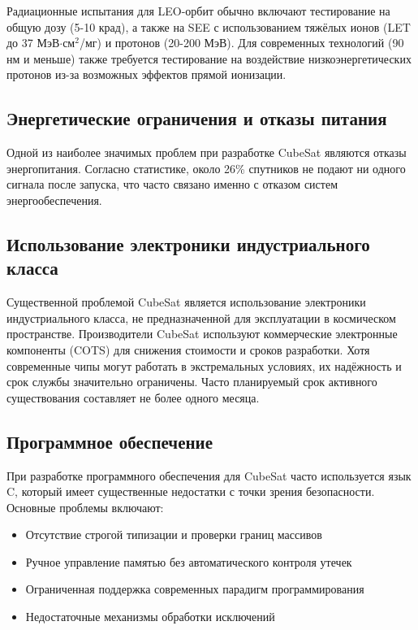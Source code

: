 Радиационные испытания для LEO-орбит обычно включают тестирование на общую дозу (5-10 крад), а также на SEE с использованием тяжёлых ионов (LET до 37 МэВ$\cdot$см$^2$/мг) и протонов (20-200 МэВ)\cite{proton_guide}. Для современных технологий (90 нм и меньше) также требуется тестирование на воздействие низкоэнергетических протонов из-за возможных эффектов прямой ионизации\cite{escc_see_test}.



\subsection{Энергетические ограничения и отказы питания}
Одной из наиболее значимых проблем при разработке CubeSat являются отказы энергопитания. Согласно статистике, около 26\% спутников не подают ни одного сигнала после запуска, что часто связано именно с отказом систем энергообеспечения\cite{kulu2020nanosats}.

\subsection{Использование электроники индустриального класса}
Существенной проблемой CubeSat является использование электроники индустриального класса, не предназначенной для эксплуатации в космическом пространстве\cite{scholz2015cots}. Производители CubeSat используют коммерческие электронные компоненты (COTS) для снижения стоимости и сроков разработки. Хотя современные чипы могут работать в экстремальных условиях, их надёжность и срок службы значительно ограничены. Часто планируемый срок активного существования составляет не более одного месяца\cite{scholz2015cots}.

\subsection{Программное обеспечение}
При разработке программного обеспечения для CubeSat часто используется язык C, который имеет существенные недостатки с точки зрения безопасности. Основные проблемы включают:

\begin{itemize}
	\item Отсутствие строгой типизации и проверки границ массивов
	\item Ручное управление памятью без автоматического контроля утечек
	\item Ограниченная поддержка современных парадигм программирования
	\item Недостаточные механизмы обработки исключений
\end{itemize}

